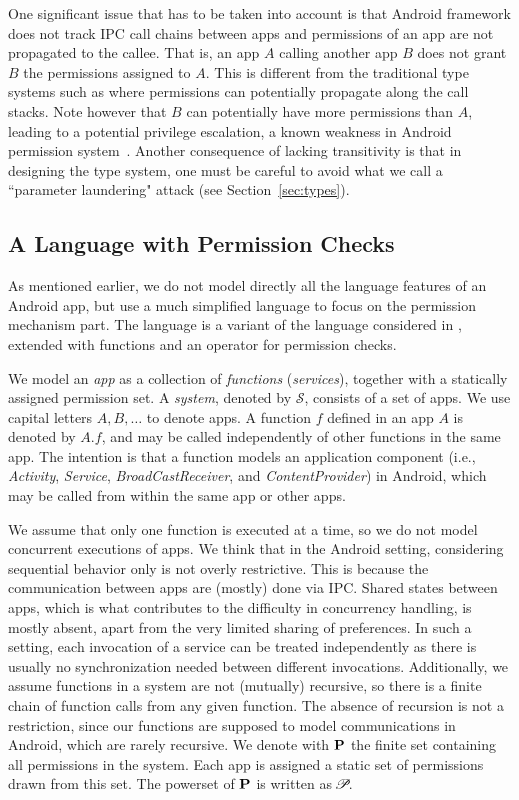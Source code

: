 One significant issue that has to be taken into account is that Android framework does not track IPC call chains between apps and permissions of an app are not propagated to the callee. That is, an app $A$ calling another app $B$ does not grant $B$ the permissions assigned to $A$. This is different from the traditional type systems such as {\BN} where permissions can potentially propagate along the call stacks. Note however that $B$ can potentially have more permissions than $A$, leading to a potential privilege escalation, a known weakness in Android permission system~\cite{Chin:2011wa}. Another consequence of lacking transitivity is that in designing the type system, one must be careful to avoid what we call a ``parameter laundering" attack (see Section~\ref{sec:types}).

\subsection{A Language with Permission Checks}\label{sec:language}

As mentioned earlier, we do not model directly all the language features of an Android app, but use a much simplified language to focus on the permission mechanism part. The language is a variant of the  language considered in \cite{Volpano:1996}, extended with functions and an operator for permission checks.

We model an \emph{app} as a collection of \emph{functions}
(\emph{services}), together with a statically assigned permission
set. A \emph{system}, denoted by $\mathcal{S}$, consists of a set of
apps. We use capital letters $A,B,\ldots$ to denote apps. A function
$f$ defined in an app $A$ is denoted by $A.f$, and may be called
independently of other functions in the same app. The intention is
that a function models an  application component (i.e.,
\emph{Activity}, \emph{Service}, \emph{BroadCastReceiver}, and
\emph{ContentProvider}) in Android, which may be called from within
the same app or other apps.

We assume that only one function is
executed at a time, so we do not model concurrent executions of
apps. We think that in the Android setting, considering sequential behavior only is
not overly restrictive. This is because the communication between apps are
(mostly) done via IPC. Shared states between apps,
which is what contributes to the difficulty in concurrency handling, is mostly
absent, apart from the very limited sharing of preferences. In such a setting,
each invocation of a service can be treated independently as there is usually
no synchronization needed between different invocations. Additionally, we assume functions in a system are not (mutually)
recursive, so there is a finite chain of function calls from any given
function. The absence of recursion is not a restriction, since our
functions are supposed to model communications in Android, which are
rarely recursive. We denote with $\mathbf{P}$ the finite set containing all permissions in
the system. Each app is assigned a static set of permissions drawn
from this set. The powerset of $\mathbf{P}$ is written as $\!\mathscr{P}\!$.  


